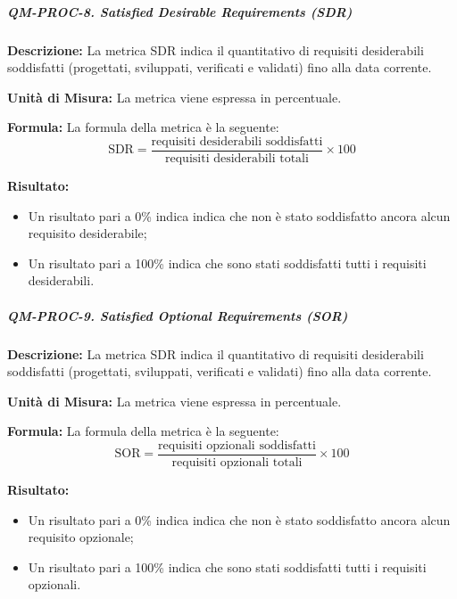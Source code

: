 			\subparagraph{QM-PROC-8. Satisfied Desirable Requirements (SDR)}

				\textbf{Descrizione: }
				La metrica SDR indica il quantitativo di requisiti desiderabili soddisfatti (progettati, sviluppati, verificati e validati) fino alla data corrente.

				\textbf{Unità di Misura: }
				La metrica viene espressa in percentuale.

				\textbf{Formula: }
				La formula della metrica è la seguente:
				\[
					\text{SDR} = \frac{\text{requisiti desiderabili soddisfatti}}{\text{requisiti desiderabili totali}} \times 100
				\]

				\textbf{Risultato: }
				\begin{itemize}
					\item Un risultato pari a 0\% indica indica che non è stato soddisfatto ancora alcun requisito desiderabile;
					\item Un risultato pari a 100\% indica che sono stati soddisfatti tutti i requisiti desiderabili.
				\end{itemize}

			\subparagraph{QM-PROC-9. Satisfied Optional Requirements (SOR)}

				\textbf{Descrizione: }
				La metrica SDR indica il quantitativo di requisiti desiderabili soddisfatti (progettati, sviluppati, verificati e validati) fino alla data corrente.

				\textbf{Unità di Misura: }
				La metrica viene espressa in percentuale.

				\textbf{Formula: }
				La formula della metrica è la seguente:
				\[
					\text{SOR} = \frac{\text{requisiti opzionali soddisfatti}}{\text{requisiti opzionali totali}} \times 100
				\]

				\textbf{Risultato: }
				\begin{itemize}
					\item Un risultato pari a 0\% indica indica che non è stato soddisfatto ancora alcun requisito opzionale;
					\item Un risultato pari a 100\% indica che sono stati soddisfatti tutti i requisiti opzionali.
				\end{itemize}


